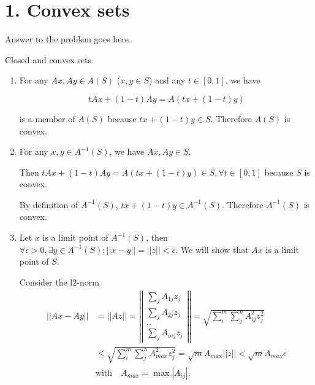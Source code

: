 \documentclass[12pt,letterpaper]{article}
\begin{document}
\section*{1. Convex sets}

Answer to the problem goes here.

\begin{alphalist}

\item Closed and convex sets.
\begin{enumerate}[label=(\roman*)]
    \item
        For any $Ax, Ay \in A(S)$ ($x, y \in S$) and any $t \in [0, 1]$, we have

        \[t Ax + (1 - t) Ay = A (t x + (1- t)y)\]

        is a member of $A(S)$ because $t x + (1-t) y \in S$.
        Therefore $A(S)$ is convex.

    \item
        For any $x, y \in A^{-1}(S)$, we have $Ax, Ay \in S$.

        Then $t Ax + (1-t)Ay = A(t x + (1-t)y) \in S,
        \forall t \in [0, 1]$ because $S$ is convex.

        By definition of $A^{-1}(S)$, $t x + (1-t)y \in A^{-1}(S)$. Therefore $A^{-1}(S)$ is convex.

    \item
        Let $x$ is a limit point of $A^{-1}(S)$, then $\forall{}\epsilon{}>0,
        \exists{}y \in A^{-1}(S): ||x - y|| = ||z|| < \epsilon$. We will show
        that $Ax$ is a limit point of $S$.

        Consider the l2-norm
        \[
        \begin{split}
            ||Ax - Ay|| &= ||Az||  = \left|\left|\begin{matrix} \sum_j A_{1j}z_j \\ \sum_j A_{2j}z_j \\ .. \\ \sum_j A_{mj}z_j\end{matrix}\right|\right|
                        = \sqrt{\sum_i^m\sum_j^nA_{ij}^2 z_j^2} \\
                        &\le \sqrt{\sum_i^m \sum_j^n A_{max}^2 z_j^2} =\sqrt{m} A_{max} ||z|| < \sqrt{m}A_{max}\epsilon \\
                        &\text{with} \quad A_{max} = \max{|A_{ij}|}.
        \end{split}
    \]


\end{enumerate}
\end{alphalist}
\end{document}
